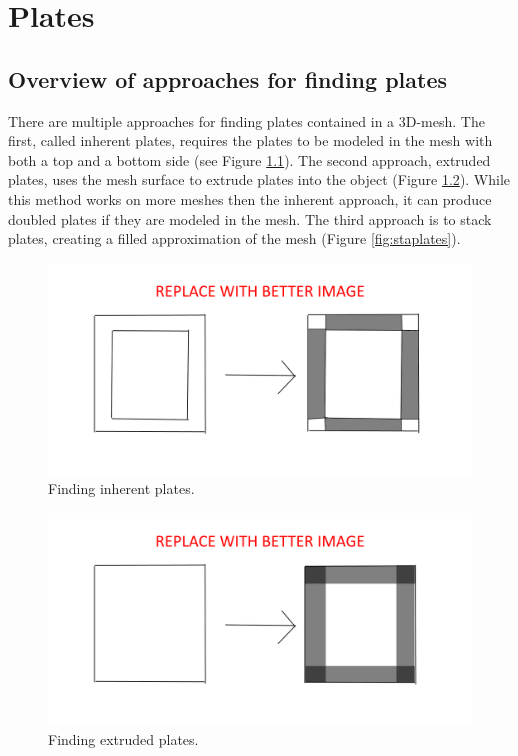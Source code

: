 \documentclass[../ClassicThesis.tex]{subfiles}
\begin{document}
\chapter{Plates}\label{ch:plates}

\section{Overview of approaches for finding plates}

There are multiple approaches for finding plates contained in a 3D-mesh. The first, called inherent plates, requires the plates to be modeled in the mesh with both a top and a bottom side (see Figure \ref{fig:inhplates}). The second approach, extruded plates, uses the mesh surface to extrude plates into the object (Figure \ref{fig:extplates}). While this method works on more meshes then the inherent approach, it can produce doubled plates if they are modeled in the mesh. The third approach is to stack plates, creating a filled approximation of the mesh (Figure \ref{fig:staplates}).

\begin{figure}
    \includegraphics[width=1.0\columnwidth]{Images/plates_inherentplates.png}
    \caption{Finding inherent plates.}
    \label{fig:inhplates}
\end{figure}

\begin{figure}
    \includegraphics[width=1.0\columnwidth]{Images/plates_extrudedplates.png}
    \caption{Finding extruded plates.}
    \label{fig:extplates}
\end{figure}
\end{document}
